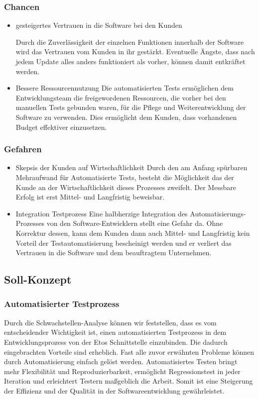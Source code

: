 \subsubsection{Chancen}
\begin{itemize}	
	\item gesteigertes Vertrauen in die Software bei den Kunden
	
	Durch die Zuverlässigkeit der einzelnen Funktionen innerhalb der Software wird das Vertrauen vom Kunden in ihr gestärkt. Eventuelle Ängste, dass nach jedem Update alles anders funktioniert als vorher, können damit entkräftet werden.
	
	\item Bessere Ressourcennutzung
	Die automatisierten Tests ermöglichen dem Entwicklungsteam die freigewordenen Ressourcen, die vorher bei den manuellen Tests gebunden waren, für die Pflege und Weiterentwicklung der Software zu verwenden. Dies ermöglicht dem Kunden, dass vorhandenen Budget effektiver einzusetzen.
	
\end{itemize}
\subsubsection{Gefahren}
\begin{itemize}	
	\item Skepsis der Kunden auf Wirtschaftlichkeit
	Durch den am Anfang spürbaren Mehraufwand für Automatisierte Tests, besteht die Möglichkeit das der Kunde an der Wirtschaftlichkeit dieses Prozesses zweifelt. Der Messbare Erfolg ist erst Mittel- und Langfristig beweisbar.
	
	\item Integration Testprozess
	Eine halbherzige Integration des Automatisierungs-Prozesses von den Software-Entwicklern stellt eine Gefahr da. Ohne Korrektur dessen, kann dem Kunden dann auch Mittel- und Langfristig kein Vorteil der Testautomatisierung bescheinigt werden und er verliert das Vertrauen in die Software und dem beauftragtem Unternehmen.
	
	
\end{itemize}

\subsection{Soll-Konzept}
\subsubsection{Automatisierter Testprozess}
Durch die Schwachstellen-Analyse können wir feststellen, dass es vom entscheidender Wichtigkeit
ist, einen automatisierten Testprozess in dem Entwicklungsprozess von der Etos Schnittstelle einzubinden. Die dadurch eingebrachten Vorteile sind erheblich. Fast alle zuvor erwähnten Probleme können durch Automatisierung einfach gelöst werden. Automatisiertes Testen bringt mehr Flexibilität und Reproduzierbarkeit, ermöglicht Regressionstest in jeder Iteration und erleichtert Testern maßgeblich die Arbeit. Somit ist eine Steigerung der Effizienz und der Qualität in der Softwareentwicklung gewährleistet.

